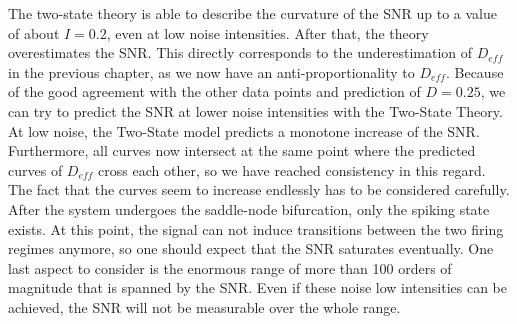 \documentclass[12pt,a4paper]{article}
\begin{document}
The two-state theory is able to describe the curvature of the SNR up to a value of about $I=0.2$, even at low noise intensities. After that, the theory overestimates the SNR. This directly corresponds to the underestimation of $D_{eff}$ in the previous chapter, as we now have an anti-proportionality to $D_{eff}$.
Because of the good agreement with the other data points and prediction of $D=0.25$, we can try to predict the SNR at lower noise intensities with the Two-State Theory.\\
At low noise, the Two-State model predicts a monotone increase of the SNR. Furthermore, all curves now intersect at the same point where the predicted curves of $D_{eff}$ cross each other, so we have reached consistency in this regard. The fact that the curves seem to increase endlessly has to be considered carefully. After the system undergoes the saddle-node bifurcation, only the spiking state exists. At this point, the signal can not induce transitions between the two firing regimes anymore, so one should expect that the SNR saturates eventually. One last aspect to consider is the enormous range of more than 100 orders of magnitude that is spanned by the SNR. Even if these noise low intensities can be achieved, the SNR will not be measurable over the whole range.
\end{document}
